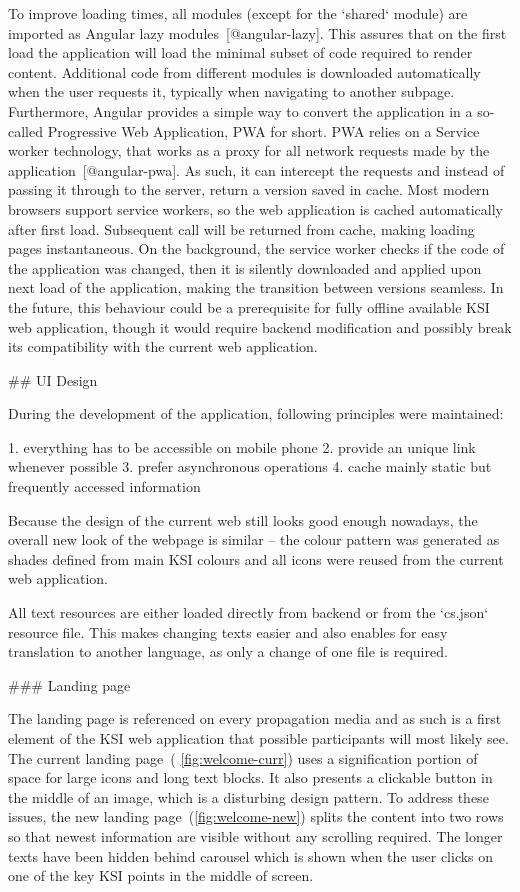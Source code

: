 \documentclass[
  digital, %
  oneside, %
  lof,     %
  nolot,     %
]{fithesis4}
\begin{document}
{To improve loading times, all modules (except for the `shared` module) are imported as Angular lazy modules~[@angular-lazy]. This assures that on the first load the application will load the minimal subset of code required to render content. Additional code from different modules is downloaded automatically when the user requests it, typically when navigating to another subpage. Furthermore, Angular provides a simple way to convert the application in a so-called Progressive Web Application, PWA for short. PWA relies on a Service worker technology, that works as a proxy for all network requests made by the application~[@angular-pwa]. As such, it can intercept the requests and instead of passing it through to the server, return a version saved in cache. Most modern browsers support service workers, so the web application is cached automatically after first load. Subsequent call will be returned from cache, making loading pages instantaneous. On the background, the service worker checks if the code of the application was changed, then it is silently downloaded and applied upon next load of the application, making the transition between versions seamless. In the future, this behaviour could be a prerequisite for fully offline available KSI web application, though it would require backend modification and possibly break its compatibility with the current web application.

## UI Design

During the development of the application, following principles were maintained:

1. everything has to be accessible on mobile phone
2. provide an unique link whenever possible
3. prefer asynchronous operations
4. cache mainly static but frequently accessed information

Because the design of the current web still looks good enough nowadays, the overall new look of the webpage is similar -- the colour pattern was generated as shades defined from main KSI colours and all icons were reused from the current web application.

All text resources are either loaded directly from backend or from the `cs.json` resource file. This makes changing texts easier and also enables for easy translation to another language, as only a change of one file is required.

### Landing page

The landing page is referenced on every propagation media and as such is a first element of the KSI web application that possible participants will most likely see. The current landing page~( \autoref{fig:welcome-curr}) uses a signification portion of space for large icons and long text blocks. It also presents a clickable button in the middle of an image, which is a disturbing design pattern. To address these issues, the new landing page~(\autoref{fig:welcome-new}) splits the content into two rows so that newest information are visible without any scrolling required. The longer texts have been hidden behind carousel which is shown when the user clicks on one of the key KSI points in the middle of screen.

}
\end{document}
